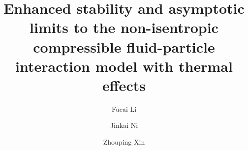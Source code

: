 \documentclass[reqno,11pt]{amsart}
\theoremstyle{plain}
\numberwithin{equation}{section}
\begin{document}
\title[The non-isentropic compressible fluid-particle interaction model]
{Enhanced stability and asymptotic limits to the non-isentropic compressible 
fluid-particle interaction model with thermal  effects}
 


\author[F. Li]{Fucai Li}
\address{School of Mathematics, Nanjing University, Nanjing
 210093, P. R. China}


\author[J. Ni]{Jinkai Ni} 
\address{School of Mathematics, Nanjing University, Nanjing
 210093, P. R. China}
 
\author[Z. Xin]{Zhouping Xin} 
\address{The Institute of Mathematical Sciences, The Chinese University of Hong Kong,  
Shatin, New Territories, Hong Kong}

 
\end{document}
